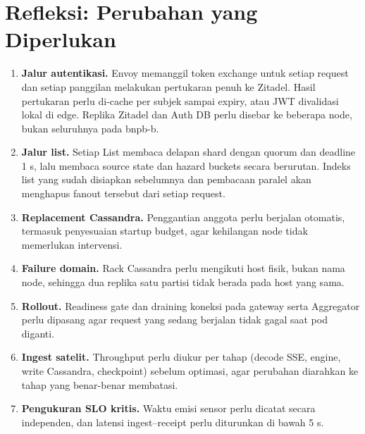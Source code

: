 \section{Refleksi: Perubahan yang Diperlukan}
\begin{enumerate}
\item \textbf{Jalur autentikasi.} Envoy memanggil token exchange untuk setiap request dan setiap panggilan melakukan pertukaran penuh ke Zitadel. Hasil pertukaran perlu di-cache per subjek sampai expiry, atau JWT divalidasi lokal di edge. Replika Zitadel dan Auth DB perlu disebar ke beberapa node, bukan seluruhnya pada bnpb-b.
\item \textbf{Jalur list.} Setiap List membaca delapan shard dengan quorum dan deadline 1 s, lalu membaca source state dan hazard buckets secara berurutan. Indeks list yang sudah disiapkan sebelumnya dan pembacaan paralel akan menghapus fanout tersebut dari setiap request.
\item \textbf{Replacement Cassandra.} Penggantian anggota perlu berjalan otomatis, termasuk penyesuaian startup budget, agar kehilangan node tidak memerlukan intervensi.
\item \textbf{Failure domain.} Rack Cassandra perlu mengikuti host fisik, bukan nama node, sehingga dua replika satu partisi tidak berada pada host yang sama.
\item \textbf{Rollout.} Readiness gate dan draining koneksi pada gateway serta Aggregator perlu dipasang agar request yang sedang berjalan tidak gagal saat pod diganti.
\item \textbf{Ingest satelit.} Throughput perlu diukur per tahap (decode SSE, engine, write Cassandra, checkpoint) sebelum optimasi, agar perubahan diarahkan ke tahap yang benar-benar membatasi.
\item \textbf{Pengukuran SLO kritis.} Waktu emisi sensor perlu dicatat secara independen, dan latensi ingest--receipt perlu diturunkan di bawah 5 s.
\end{enumerate}

